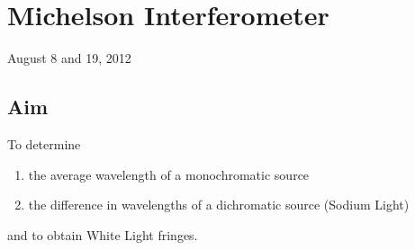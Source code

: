 \chapter{Michelson Interferometer}
\begin{flushright}
August 8 and 19, 2012 \\
\end{flushright}

\section{Aim}
	To determine
	\begin{enumerate}
		\item the average wavelength of a monochromatic source 
		\item the difference in wavelengths of a dichromatic source (Sodium Light)
	\end{enumerate}
	and to obtain White Light fringes.

